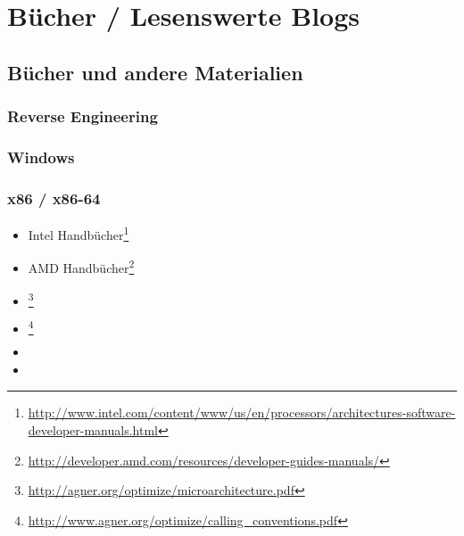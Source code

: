 \chapter{Bücher / Lesenswerte Blogs}

\section{Bücher und andere Materialien}

\subsection{Reverse Engineering}



\subsection{Windows}



\subsection{\CCpp}



\subsection{x86 / x86-64}

\label{x86_manuals}
\begin{itemize}
\item Intel Handbücher\footnote{\AlsoAvailableAs \url{http://www.intel.com/content/www/us/en/processors/architectures-software-developer-manuals.html}}

\item AMD Handbücher\footnote{\AlsoAvailableAs \url{http://developer.amd.com/resources/developer-guides-manuals/}}

\item \AgnerFog{}\footnote{\AlsoAvailableAs \url{http://agner.org/optimize/microarchitecture.pdf}}

\item \AgnerFogCC{}\footnote{\AlsoAvailableAs \url{http://www.agner.org/optimize/calling_conventions.pdf}}

\item \IntelOptimization

\item \AMDOptimization
\end{itemize}

